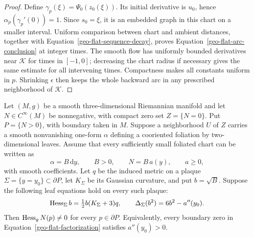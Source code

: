 \begin{proof}
Define $\gamma_p(\xi)=\Psi_0(z_0(\xi))$.  Its initial derivative is
$u_0$, hence $\alpha_p(\gamma_p'(0))=1$.  Since $s_0=\xi$, it is an
embedded graph in this chart on a smaller interval.  Uniform comparison
between chart and ambient distances, together with
Equation~\eqref{geo-flat-sequence-decay}, proves
Equation~\eqref{geo-flat-arc-conclusion} at integer times.  The smooth
flow has uniformly bounded derivatives near $\mathcal K$ for times
in $[-1,0]$; decreasing the chart radius if necessary gives the same
estimate for all intervening times.  Compactness makes all constants
uniform in $p$.  Shrinking $\epsilon$ then keeps the whole backward arc
in any prescribed neighborhood of $\mathcal K$.
\end{proof}

\begin{lemma}
\label{geo-flat-exclusion}
Let $(M,g)$ be a smooth three-dimensional Riemannian manifold and let
$N\in C^\infty(M)$ be nonnegative, with compact zero set
$Z=\{N=0\}$.  Put $P=\{N>0\}$, with boundary taken in $M$.
Suppose a neighborhood $U$ of $Z$ carries a smooth nonvanishing one-form
$\alpha$ defining a cooriented foliation by two-dimensional leaves.
Assume that every sufficiently small foliated chart can be written as
\begin{equation}
\label{geo-flat-factorization}
 \alpha=B\,\mathrm dy,\qquad B>0,\qquad
 N=B\,a(y),\qquad a\geq0,
\end{equation}
with smooth coefficients.  Let $q$ be the induced metric on a plaque
$\Sigma=\{y=y_0\}\subset\partial P$, let $K_\Sigma$ be its Gaussian
curvature, and put $b=\sqrt B$.  Suppose the following leaf equations
hold on every such plaque:
\begin{equation}
\label{geo-flat-leaf-equations}
 \operatorname{Hess}_\Sigma b=\tfrac12 b(K_\Sigma+3)q,
 \qquad
 \Delta_\Sigma(b^2)=6b^2-a''(y_0).
\end{equation}
Then $\operatorname{Hess}_gN(p)\ne0$ for every $p\in\partial P$.
Equivalently, every boundary zero in
Equation~\eqref{geo-flat-factorization} satisfies $a''(y_0)>0$.
\end{lemma}

